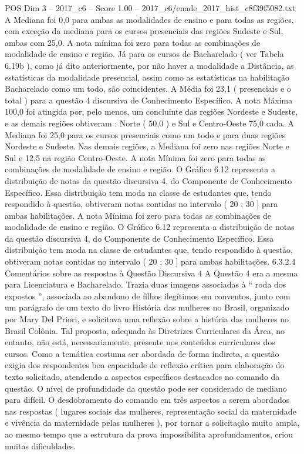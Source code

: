 \begin{textsample}{POS Dim 3 – 2017\_c6 – Score 1.00 – 2017\_c6/enade\_2017\_hist\_c8f39f5082.txt}
A Mediana foi 0,0 para ambas as modalidades de ensino e para todas as regiões, com exceção da mediana para os cursos presenciais das regiões Sudeste e Sul, ambas com 25,0.
A nota mínima foi zero para todas as combinações de modalidade de ensino e região.
Já para os cursos de Bacharelado ( ver Tabela 6.19b ), como já dito anteriormente, por não haver a modalidade a Distância, as estatísticas da modalidade presencial, assim como as estatísticas na habilitação Bacharelado como um todo, são coincidentes.
A Média foi 23,1 ( presenciais e o total ) para a questão 4 discursiva de Conhecimento Específico.
A nota Máxima 100,0 foi atingida por, pelo menos, um concluinte das regiões Nordeste e Sudeste, e as demais regiões obtiveram : Norte ( 50,0 ) e Sul e Centro-Oeste 75,0 cada.
A Mediana foi 25,0 para os cursos presenciais como um todo e para duas regiões Nordeste e Sudeste.
Nas demais regiões, a Mediana foi zero nas regiões Norte e Sul e 12,5 na região Centro-Oeste.
A nota Mínima foi zero para todas as combinações de modalidade de ensino e região.
O Gráfico 6.12 representa a distribuição de notas da questão discursiva 4, do Componente de Conhecimento Específico.
Essa distribuição tem moda na classe de estudantes que, tendo respondido à questão, obtiveram notas contidas no intervalo ( 20 ; 30 ] para ambas habilitações.
A nota Mínima foi zero para todas as combinações de modalidade de ensino e região.
O Gráfico 6.12 representa a distribuição de notas da questão discursiva 4, do Componente de Conhecimento Específico.
Essa distribuição tem moda na classe de estudantes que, tendo respondido à questão, obtiveram notas contidas no intervalo ( 20 ; 30 ] para ambas habilitações. 6.3.2.4 Comentários sobre as respostas à Questão Discursiva 4 A Questão 4 era a mesma para Licenciatura e Bacharelado.
Trazia duas imagens associadas à “ roda dos expostos ”, associada ao abandono de filhos ilegítimos em conventos, junto com um parágrafo de um texto do livro História das mulheres no Brasil, organizado por Mary Del Priori, e solicitava uma reflexão sobre a história das mulheres no Brasil Colônia.
Tal proposta, adequada às Diretrizes Curriculares da Área, no entanto, não está, necessariamente, presente nos conteúdos curriculares dos cursos.
Como a temática costuma ser abordada de forma indireta, a questão exigia dos respondentes boa capacidade de reflexão crítica para elaboração do texto solicitado, atendendo a aspectos específicos destacados no comando da questão.
O nível de profundidade da questão pode ser considerado de mediano para difícil.
O desdobramento do comando em três aspectos a serem abordados nas respostas ( lugares sociais das mulheres, representação social da maternidade e vivência da maternidade pelas mulheres ), por tornar a solicitação muito ampla, ao mesmo tempo que a estrutura da prova impossibilita aprofundamentos, criou muitas dificuldades.

\end{textsample}
